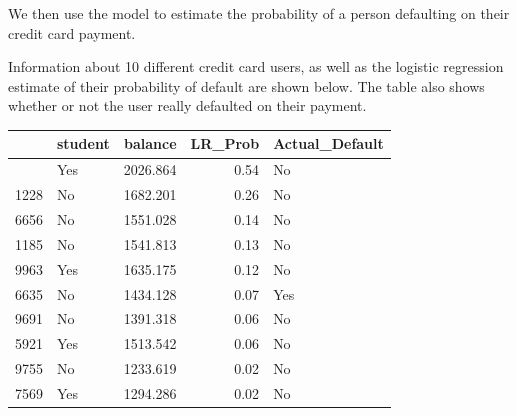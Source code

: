 \documentclass[
  letterpaper,
  DIV=11,
  numbers=noendperiod]{scrreprt}
\newenvironment{Shaded}{\begin{snugshade}}{\end{snugshade}}
\newcommand{\AttributeTok}[1]{\textcolor[rgb]{0.40,0.45,0.13}{#1}}
\newcommand{\DecValTok}[1]{\textcolor[rgb]{0.68,0.00,0.00}{#1}}
\newcommand{\FunctionTok}[1]{\textcolor[rgb]{0.28,0.35,0.67}{#1}}
\newcommand{\NormalTok}[1]{\textcolor[rgb]{0.00,0.23,0.31}{#1}}
\newcommand{\OtherTok}[1]{\textcolor[rgb]{0.00,0.23,0.31}{#1}}
\newcommand{\SpecialCharTok}[1]{\textcolor[rgb]{0.37,0.37,0.37}{#1}}
\newcommand{\StringTok}[1]{\textcolor[rgb]{0.13,0.47,0.30}{#1}}
\begin{document}
We then use the model to estimate the probability of a person defaulting
on their credit card payment.

Information about 10 different credit card users, as well as the
logistic regression estimate of their probability of default are shown
below. The table also shows whether or not the user really defaulted on
their payment.

\begin{Shaded}
\end{Shaded}

\begin{longtable}[]{@{}llrrl@{}}
\toprule\noalign{}
& student & balance & LR\_Prob & Actual\_Default \\
\midrule\noalign{}
\endhead
\bottomrule\noalign{}
\endlastfoot
2465 & Yes & 2026.864 & 0.54 & No \\
1228 & No & 1682.201 & 0.26 & No \\
6656 & No & 1551.028 & 0.14 & No \\
1185 & No & 1541.813 & 0.13 & No \\
9963 & Yes & 1635.175 & 0.12 & No \\
6635 & No & 1434.128 & 0.07 & Yes \\
9691 & No & 1391.318 & 0.06 & No \\
5921 & Yes & 1513.542 & 0.06 & No \\
9755 & No & 1233.619 & 0.02 & No \\
7569 & Yes & 1294.286 & 0.02 & No \\
\end{longtable}
\end{document}
